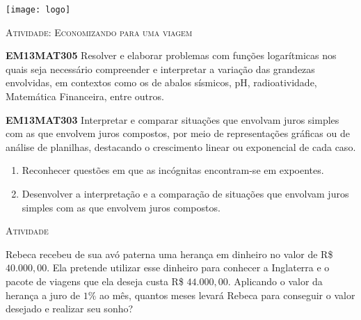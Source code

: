 \documentclass[10 pt,usenames,dvipsnames, oneside]{article}
\begin{document}
\begin{center}
  \begin{minipage}[l]{3cm}
\texttt{[image: logo]}    
\end{minipage}\hfill
\begin{minipage}[r]{.8\textwidth}
 {\Large \scshape Atividade: Economizando para uma viagem}  
\end{minipage}
\end{center}
\vspace{.2cm}

\ifdefined\prof
\begin{objetivos}
\item \textbf{EM13MAT305} Resolver e elaborar problemas com funções logarítmicas nos quais seja necessário compreender e interpretar a variação das grandezas envolvidas, em contextos como os de abalos sísmicos, pH, radioatividade, Matemática Financeira, entre outros.

\item \textbf{EM13MAT303} Interpretar e comparar situações que envolvam juros simples com as que envolvem juros compostos, por meio de representações gráficas ou de análise de planilhas, destacando o crescimento linear ou exponencial de cada caso.
\end{objetivos}

\begin{goals}
\begin{enumerate}
\item Reconhecer questões em que as incógnitas encontram-se em expoentes.
\item Desenvolver a interpretação e a comparação de situações que envolvam juros simples com as que envolvem juros compostos.
\end{enumerate}

\end{goals}

\bigskip
\begin{center}
{\large \scshape Atividade}
\end{center}
\fi

Rebeca recebeu de sua avó paterna uma herança em dinheiro no valor de R\$ $40.000{,}00$. Ela pretende utilizar esse dinheiro para conhecer a Inglaterra e o pacote de viagens que ela deseja custa R\$ $44.000{,}00$. Aplicando o valor da herança a juro de $1\%$ ao mês, quantos meses levará Rebeca para conseguir o valor desejado e realizar seu sonho?
\end{document}
